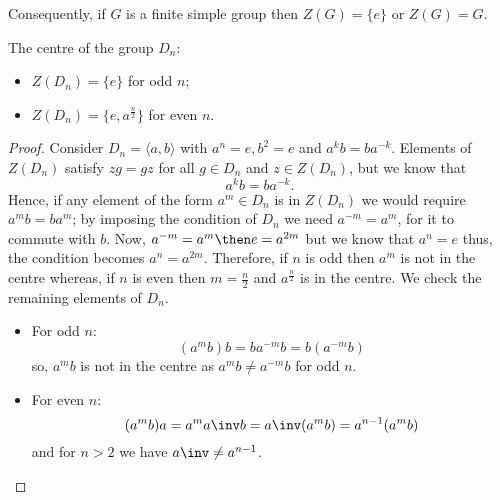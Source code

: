 \documentclass[12pt, a4paper]{article}
\begin{document}
\begin{corollary}
    Consequently, if \(G\) is a finite simple group then \(Z(G)=\{e\}\) or \(Z(G)=G\).
\end{corollary}

\begin{mdprop}
    The centre of the group \(D_n\):
    \begin{itemize}
        \item \(Z(D_n)= \{e\}\) for odd \(n\);
        \item \(Z(D_n) = \{e,a^{\frac{n}{2}}\}\) for even \(n\).
    \end{itemize}
\end{mdprop}

\begin{proof}
    Consider \(D_n = \langle a,b \rangle\) with \(a^n=e,b^2 =e\) and \(a^k b= ba^{-k}\). Elements of \(Z(D_n)\) satisfy \(zg=gz\) for all \(g \in D_n\) and \(z \in Z(D_n)\), but we know that 
    \[a^k b=ba^{-k}.\]
    Hence, if any element of the form \(a^m \in D_n\) is in \(Z(D_n)\) we would require \(a^m b =ba^m\); by imposing the condition of \(D_n\) we need \(a^{-m}=a^m\), for it to commute with \(b\). Now, \(a^{-m}=a^m \then e=a^{2m}\) but we know that \(a^n=e\) thus, the condition becomes \(a^n = a^{2m}\). Therefore, if \(n\) is odd then \(a^m\) is not in the centre whereas, if \(n\) is even then \(m = \frac{n}{2}\) and \(a^{\frac{n}{2}}\) is in the centre. We check the remaining elements of \(D_n\). 
    \begin{itemize}
        \item For odd \(n\): \\
        \[(a^m b)b = ba^{-m}b=b(a^{-m}b)\]
        so, \(a^m b\) is not in the centre as \(a^m b\neq a^{-m} b\) for odd \(n\).
        \item For even \(n\): \\
        \[(a^mb)a = a^m a\inv b =a\inv(a^m b) = a^{n-1}(a^m b)\]
        and for \(n >2\) we have \(a\inv \neq a^{n-1}\).
    \end{itemize}
\end{proof}

\end{document}
